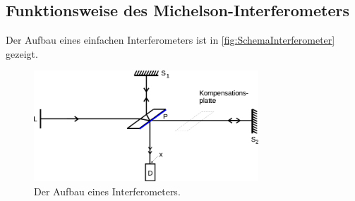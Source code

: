 \subsection{Funktionsweise des Michelson-Interferometers}

    Der Aufbau eines einfachen Interferometers ist in \autoref{fig:SchemaInterferometer} gezeigt.

    \begin{figure}
        \centering
        \includegraphics[width=0.75\textwidth]{content/img/Abb_4.pdf}
        \caption{Der Aufbau eines Interferometers. \cite{versuchsanleitung}}
        \label{fig:SchemaInterferometer}
    \end{figure}

